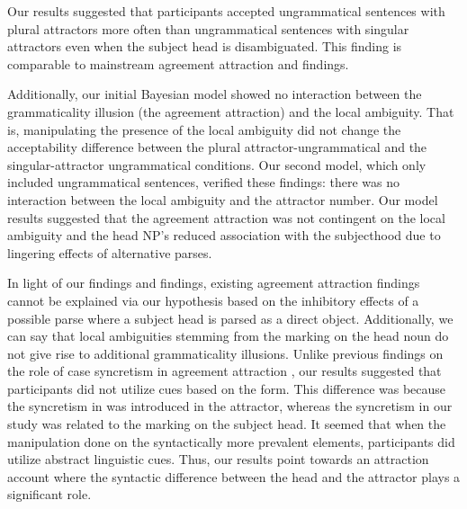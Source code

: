 Our results suggested that participants accepted ungrammatical sentences with plural attractors more often than ungrammatical sentences with singular attractors even when the subject head is disambiguated. This finding is comparable to mainstream agreement attraction and \cites{LagoEtAl2019} findings. 

Additionally, our initial Bayesian model showed no interaction between the grammaticality illusion (the agreement attraction) and the local ambiguity. That is, manipulating the presence of the local ambiguity did not change the acceptability difference between the plural attractor-ungrammatical and the singular-attractor ungrammatical conditions. Our second model, which only included ungrammatical sentences, verified these findings: there was no interaction between the local ambiguity and the attractor number. Our model results suggested that the agreement attraction was not contingent on the local ambiguity and the head NP's reduced association with the subjecthood due to lingering effects of alternative parses. 

In light of our findings and \cites{LagoEtAl2019} findings, existing agreement attraction findings cannot be explained via our hypothesis based on the inhibitory effects of a possible parse where a subject head is parsed as a direct object. Additionally, we can say that local ambiguities stemming from the marking on the head noun do not give rise to additional grammaticality illusions. Unlike previous findings on the role of case syncretism in agreement attraction \citep{Slioussar2018}, our results suggested that participants did not utilize cues based on the form. This difference was because the syncretism in  was introduced in the attractor, whereas the syncretism in our study was related to the marking on the subject head. It seemed that when the manipulation done on the syntactically more prevalent elements, participants did utilize abstract linguistic cues. Thus, our results point towards an attraction account where the syntactic difference between the head and the attractor plays a significant role.
